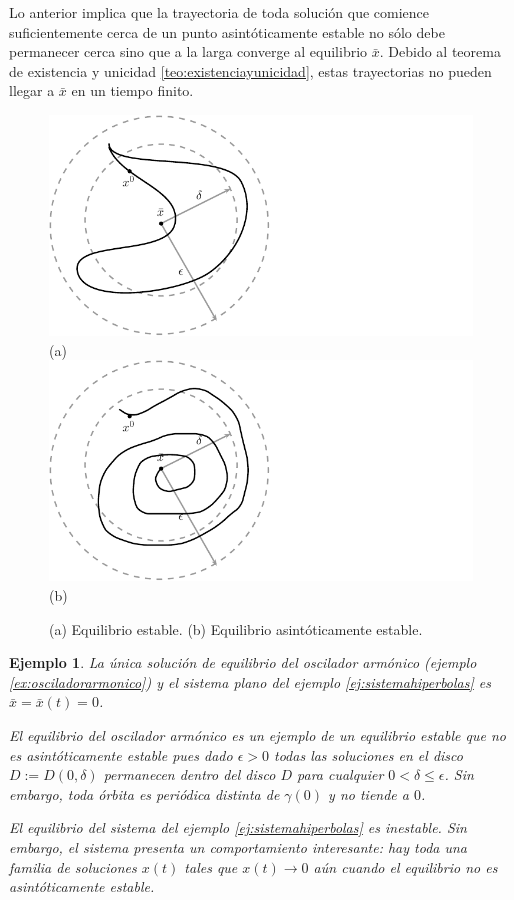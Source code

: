 \documentclass[11pt]{book}
\theoremstyle{definition}
\numberwithin{definition}{section}
\theoremstyle{theorem}
\numberwithin{theorem}{section}
\numberwithin{lemma}{section}
\numberwithin{corollary}{section}
\theoremstyle{plain}
\newtheorem{example}{Ejemplo}
\numberwithin{example}{section}
\begin{document}
Lo anterior implica que la trayectoria de toda solución que comience suficientemente cerca de un punto asintóticamente estable no sólo debe permanecer cerca sino que a la larga converge al equilibrio $\bar{x}$. Debido al teorema de existencia y unicidad \ref{teo:existenciayunicidad}, estas trayectorias no pueden llegar a $\bar{x}$ en un tiempo finito.

\begin{figure}[!ht] \centering
	\includegraphics[scale=1.0]{figures/equilibrium-stable.pdf}\\(a) \\
	\includegraphics[scale=1.0]{figures/equilibrium-asymptoticallystable.pdf}\\(b) \\
	\caption{(a) Equilibrio estable. (b) Equilibrio asintóticamente estable.}
\end{figure}

\begin{example}
La única solución de equilibrio del oscilador armónico (ejemplo \ref{ex:osciladorarmonico}) y el sistema plano del ejemplo \ref{ej:sistemahiperbolas} es $\bar{x} = \bar{x}(t) = 0$.

El equilibrio del oscilador armónico es un ejemplo de un equilibrio estable que no es asintóticamente estable pues dado $\epsilon > 0$ todas las soluciones en el disco $D := D(0, \delta)$ permanecen dentro del disco $D$ para cualquier $0 < \delta \leq \epsilon$. Sin embargo, toda órbita es periódica distinta de $\gamma(0)$ y no tiende a $0$.

El equilibrio del sistema del ejemplo \ref{ej:sistemahiperbolas} es inestable. Sin embargo, el sistema presenta un comportamiento interesante: hay toda una familia de soluciones $x(t)$ tales que $x(t) \to 0$ aún cuando el equilibrio no es asintóticamente estable.

\end{example}
\end{document}
